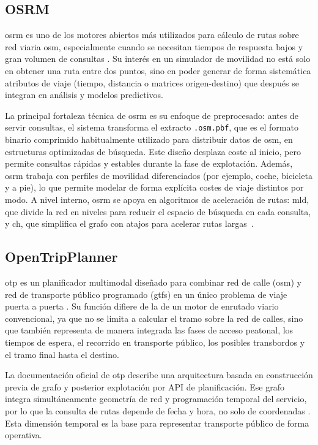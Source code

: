 \subsection{OSRM}

\gls{osrm} es uno de los motores abiertos más utilizados para cálculo de rutas sobre red viaria \gls{osm}, especialmente cuando se necesitan tiempos de respuesta bajos y gran volumen de consultas \cite{OSRMDocs,OSRMGitHub}. Su interés en un simulador de movilidad no está solo en obtener una ruta entre dos puntos, sino en poder generar de forma sistemática atributos de viaje (tiempo, distancia o matrices origen-destino) que después se integran en análisis y modelos predictivos.\newline

La principal fortaleza técnica de \gls{osrm} es su enfoque de preprocesado: antes de servir consultas, el sistema transforma el extracto \texttt{.osm.pbf}, que es el formato binario comprimido habitualmente utilizado para distribuir datos de \acrlong{osm}, en estructuras optimizadas de búsqueda. Este diseño desplaza coste al inicio, pero permite consultas rápidas y estables durante la fase de explotación. Además, \gls{osrm} trabaja con perfiles de movilidad diferenciados (por ejemplo, coche, bicicleta y a pie), lo que permite modelar de forma explícita costes de viaje distintos por modo. A nivel interno, \gls{osrm} se apoya en algoritmos de aceleración de rutas: \gls{mld}, que divide la red en niveles para reducir el espacio de búsqueda en cada consulta, y \gls{ch}, que simplifica el grafo con atajos para acelerar rutas largas~\cite{Delling2017CRP,Geisberger2008CH}.

\newpage
\subsection{OpenTripPlanner}

\gls{otp} es un planificador multimodal diseñado para combinar red de calle (\gls{osm}) y red de transporte público programado (\gls{gtfs}) en un único problema de viaje puerta a puerta \cite{OTPDocs,OTPGitHub}. Su función difiere de la de un motor de enrutado viario convencional, ya que no se limita a calcular el tramo sobre la red de calles, sino que también representa de manera integrada las fases de acceso peatonal, los tiempos de espera, el recorrido en transporte público, los posibles transbordos y el tramo final hasta el destino.\newline

La documentación oficial de \gls{otp} describe una arquitectura basada en construcción previa de grafo y posterior explotación por API de planificación. Ese grafo integra simultáneamente geometría de red y programación temporal del servicio, por lo que la consulta de rutas depende de fecha y hora, no solo de coordenadas \cite{OTPBuildConfig,OTPRouteRequest}. Esta dimensión temporal es la base para representar transporte público de forma operativa.\newline

